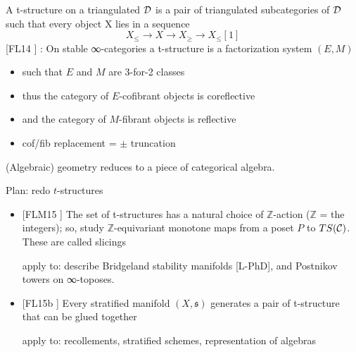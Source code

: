 \documentclass{beamer}
\def\lnk#1{\href{#1}{\faFilePdfO}}
\begin{document}
%
%
%
%
%
\begin{frame}
  A t-structure on a triangulated $\cal D$ is a pair of triangulated subcategories of $\cal D$ such that every object X lies in a sequence
\[X_{\le} \to X \to X_\ge \to X_\le[1]\]
[\alert{FL14} \lnk{https://link.springer.com/article/10.1007/s10485-015-9393-z}] : On stable ∞-categories a t-structure is a factorization system $(E,M)$
\begin{itemize}
\item<+-> such that $E$ and $M$ are 3-for-2 classes
\item<+-> thus the category of $E$-cofibrant objects is coreflective
\item<+-> and the category of $M$-fibrant objects is reflective
\item<+-> cof/fib replacement = $\pm$ truncation
\end{itemize}
(Algebraic) geometry reduces to a piece of categorical algebra.
\end{frame}
%
%
%
\begin{frame}{Plan: redo $t$-structures}
  \begin{itemize}
\item<+-> {} [\alert{FLM15} \lnk{https://link.springer.com/article/10.1007/s40062-019-00237-0}] The set of t-structures has a natural choice of $\mathbb Z$-action ($\mathbb Z$ = the integers); so, study $\mathbb Z$-equivariant monotone maps from a poset $P$ to $TS(\cal C)$. These are called \alert{slicings}

{\footnotesize apply to: describe Bridgeland stability manifolds [\alert{L-PhD\lnk{http://tetrapharmakon.github.io/stuff/main.pdf}}], and Postnikov towers on ∞-toposes.}

\item<+-> {} [\alert{FL15b} \lnk{https://arxiv.org/abs/1507.03913}] Every stratified manifold $(X,\mathfrak s)$ generates a pair of t-structure that can be glued together

{\footnotesize apply to: recollements, stratified schemes, representation of algebras}

  \end{itemize}
\end{frame}
%
%
%
%
%
\end{document}
